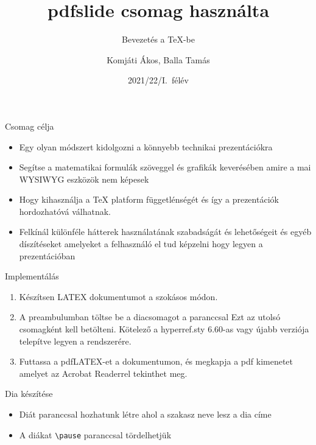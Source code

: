 \documentclass{beamer}
\begin{document}
\author{Komjáti Ákos, Balla Tamás}
\title{pdfslide csomag használta}
\subtitle{Bevezetés a \TeX-be}
\date{2021/22/I.\ félév}

\frame[plain]{\maketitle}
\begin{frame}{Csomag célja}
\begin{itemize}

\item Egy olyan módszert kidolgozni a könnyebb technikai prezentációkra\pause

\item Segítse a matematikai formulák szöveggel és grafikák keverésében amire a mai WYSIWYG eszközök nem képesek\pause

\item Hogy kihasználja a \TeX{} platform függetlénségét és így a prezentációk hordozhatóvá válhatnak.\pause

\item Felkínál különféle hátterek használatának szabadságát és lehetőségeit és egyéb díszítéseket amelyeket a felhasználó el tud képzelni hogy legyen a prezentációban

\end{itemize}
\end{frame}

\begin{frame}[fragile]{Implementálás}
\begin{enumerate}
\item Készítsen LATEX dokumentumot a szokásos módon. \pause
\item A preambulumban töltse be a diacsomagot a paranccsal \color{red}{\verb|\usepackage{pdfslide}|}\color{black} Ezt az utolsó csomagként kell betölteni. Kötelező a hyperref.sty 6.60-as vagy újabb verziója telepítve legyen a rendszerére. \pause
\item Futtassa a pdfLATEX-et a dokumentumon, és megkapja a pdf kimenetet
amelyet az Acrobat Readerrel tekinthet meg.
 
\end{enumerate}
\end{frame}

\begin{frame}[fragile]{Dia készítése}
\begin{itemize}
\item 
Diát  \color{black} paranccsal hozhatunk létre ahol a szakasz neve lesz a dia címe
\pause
\item A diákat  \color{red}\verb|\pause| \color{black}paranccsal tördelhetjük  
\end{itemize}
\end{frame}
\end{document}
